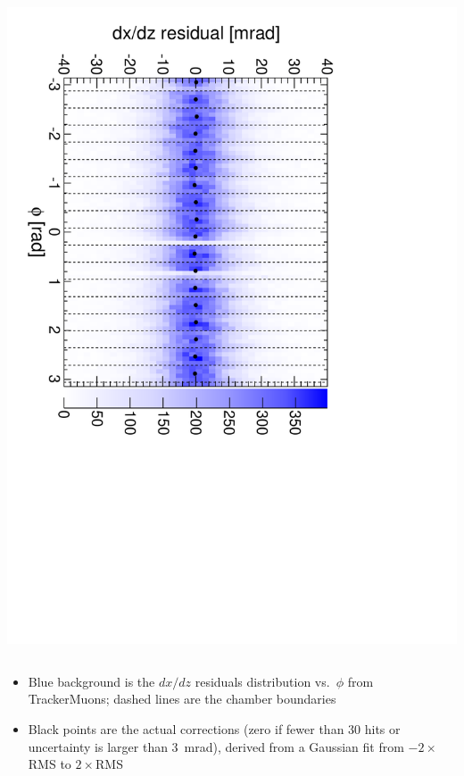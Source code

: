 \documentclass[compress]{beamer}
\begin{document}
\begin{frame}
\begin{columns}
\includegraphics[height=\linewidth, angle=90]{iter02_mep21.pdf}
\end{columns}

\begin{itemize}
\item Blue background is the $dx/dz$ residuals distribution
  vs.\ $\phi$ from TrackerMuons; dashed lines are the chamber boundaries
\item Black points are the actual corrections (zero if fewer than 30
  hits or uncertainty is larger than 3~mrad), derived from a Gaussian
  fit from $-2\times$RMS to $2\times$RMS
\end{itemize}
\end{frame}
\end{document}
